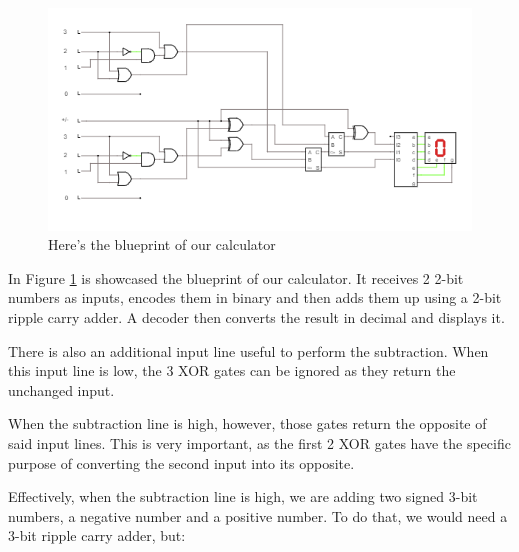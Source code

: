 \documentclass{article}
\begin{document}
\begin{figure}[h]
  \centering
  \includegraphics[scale=0.8]{real_calculator_blueprint}
  \caption{Here's the blueprint of our calculator}
  \label{real_calculator_blueprint}
\end{figure}

In Figure \ref{real_calculator_blueprint} is showcased the blueprint of our calculator. It receives 2 2-bit numbers as inputs, encodes them in binary and then adds them up using a 2-bit ripple carry adder. A decoder then converts the result in decimal and displays it.

\vspace{3mm}

There is also an additional input line useful to perform the subtraction. When this input line is low, the 3 XOR gates can be ignored as they return the unchanged input.

\vspace{3mm}

When the subtraction line is high, however, those gates return the opposite of said input lines. This is very important, as the first 2 XOR gates have the specific purpose of converting the second input into its opposite.

\vspace{3mm}

Effectively, when the subtraction line is high, we are adding two signed 3-bit numbers, a negative number and a positive number. To do that, we would need a 3-bit ripple carry adder, but:
\end{document}
